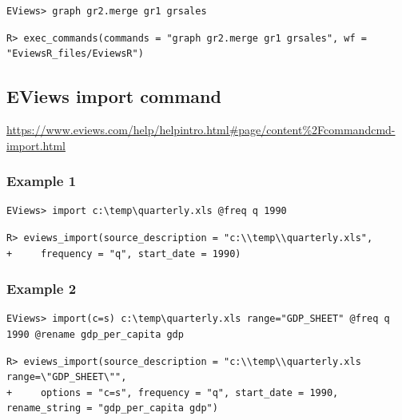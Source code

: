 \begin{verbatim}
EViews> graph gr2.merge gr1 grsales
\end{verbatim}

\begin{verbatim}
R> exec_commands(commands = "graph gr2.merge gr1 grsales", wf = "EviewsR_files/EviewsR")
\end{verbatim}

\hypertarget{eviews-import-command}{%
\subsection{EViews import command}\label{eviews-import-command}}

\url{https://www.eviews.com/help/helpintro.html\#page/content\%2Fcommandcmd-import.html}

\hypertarget{example-1-1}{%
\subsubsection{Example 1}\label{example-1-1}}

\begin{verbatim}
EViews> import c:\temp\quarterly.xls @freq q 1990
\end{verbatim}

\begin{verbatim}
R> eviews_import(source_description = "c:\\temp\\quarterly.xls",
+     frequency = "q", start_date = 1990)
\end{verbatim}

\hypertarget{example-2-1}{%
\subsubsection{Example 2}\label{example-2-1}}

\begin{verbatim}
EViews> import(c=s) c:\temp\quarterly.xls range="GDP_SHEET" @freq q 1990 @rename gdp_per_capita gdp
\end{verbatim}

\begin{verbatim}
R> eviews_import(source_description = "c:\\temp\\quarterly.xls range=\"GDP_SHEET\"",
+     options = "c=s", frequency = "q", start_date = 1990, rename_string = "gdp_per_capita gdp")
\end{verbatim}

